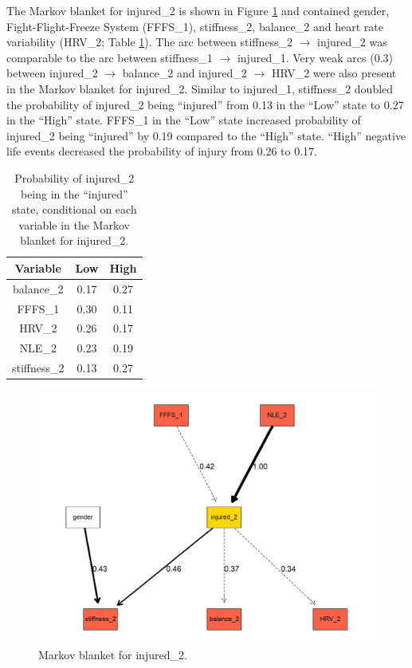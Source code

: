 \documentclass[
  english,
  man]{apa6}
\begin{document}
The Markov blanket for injured\_2 is shown in Figure \ref{fig:fig3} and contained gender, Fight-Flight-Freeze System (FFFS\_1), stiffness\_2, balance\_2 and heart rate variability (HRV\_2; Table \ref{tab:table6}).
The arc between stiffness\_2 \(\rightarrow\) injured\_2 was comparable to the arc between stiffness\_1 \(\rightarrow\) injured\_1.
Very weak arcs (0.3) between injured\_2 \(\rightarrow\) balance\_2 and injured\_2 \(\rightarrow\) HRV\_2 were also present in the Markov blanket for injured\_2.
Similar to injured\_1, stiffness\_2 doubled the probability of injured\_2 being ``injured'' from 0.13 in the ``Low'' state to 0.27 in the ``High'' state.
FFFS\_1 in the ``Low'' state increased probability of injured\_2 being ``injured'' by 0.19 compared to the ``High'' state.
``High'' negative life events decreased the probability of injury from 0.26 to 0.17.

\begin{table}[H]

\caption{\label{tab:table6}Probability of injured\_2 being in the ``injured'' state, conditional on each variable in the Markov blanket for injured\_2.}
\centering
\begin{tabular}[t]{c|c|c}
\hline
\textbf{Variable} & \textbf{Low} & \textbf{High}\\
\hline
balance\_2 & 0.17 & 0.27\\
\hline
FFFS\_1 & 0.30 & 0.11\\
\hline
HRV\_2 & 0.26 & 0.17\\
\hline
NLE\_2 & 0.23 & 0.19\\
\hline
stiffness\_2 & 0.13 & 0.27\\
\hline
\end{tabular}
\end{table}

\begin{figure}

{\centering \includegraphics[width=1\linewidth]{figures_doc/Fig3} 

}

\caption{Markov blanket for injured\_2.}\label{fig:fig3}
\end{figure}
\end{document}
